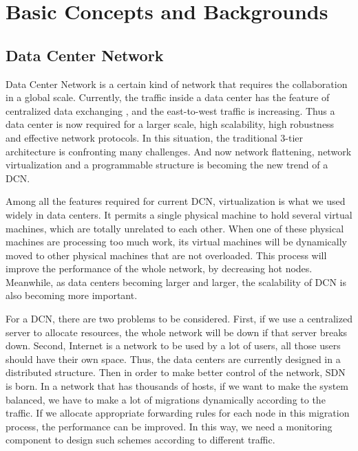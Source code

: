 
\chapter{Basic Concepts and Backgrounds}
\label{chap:Basic Concepts and Backgrounds}

\section{Data Center Network}
\label{sec:Data Center Network}
Data Center Network is a certain kind of network that requires the collaboration in a global scale. Currently, the traffic inside a data center has the feature of centralized data exchanging \cite{dcnarch}, and the east-to-west traffic is increasing. Thus a data center is now required for a larger scale, high scalability, high robustness and effective network protocols. In this situation, the traditional 3-tier architecture is confronting many challenges. And now network flattening, network virtualization and a programmable structure is becoming the new trend of a DCN.

Among all the features required for current DCN, virtualization is what we used widely in data centers. It permits a single physical machine to hold several virtual machines, which are totally unrelated to each other. When one of these physical machines are processing too much work, its virtual machines will be dynamically moved to other physical machines that are not overloaded. This process will improve the performance of the whole network, by decreasing hot nodes. Meanwhile, as data centers becoming larger and larger, the scalability of DCN is also becoming more important. 

For a DCN, there are two problems to be considered. First, if we use a centralized server to allocate resources, the whole network will be down if that server breaks down. Second, Internet is a network to be used by a lot of users, all those users should have their own space. Thus, the data centers are currently designed in a distributed structure. Then in order to make better control of the network, SDN is born. In a network that has thousands of hosts, if we want to make the system balanced, we have to make a lot of migrations dynamically according to the traffic. If we allocate appropriate forwarding rules for each node in this migration process, the performance can be improved. In this way, we need a monitoring component to design such schemes according to different traffic.

